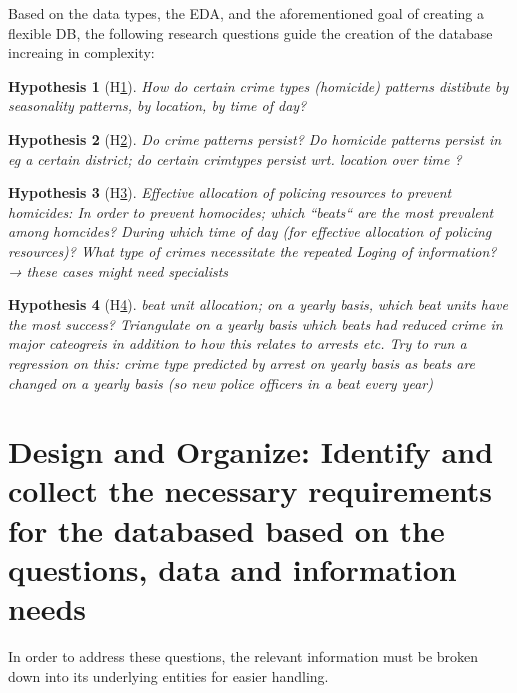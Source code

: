 \documentclass[a4paper]{article}
\newtheorem{hyp}{Hypothesis}
\begin{document}
Based on the data types, the EDA, and the aforementioned goal of creating a flexible DB, the following research questions guide the creation of the database increaing in complexity:


\begin{hyp}[H\ref{hyp:first}] \label{hyp:first}
How do certain crime types (homicide) patterns distibute by seasonality patterns, by location, by time of day?
\end{hyp}

\begin{hyp}[H\ref{hyp:second}] \label{hyp:second}
Do crime patterns persist? Do homicide patterns persist in eg a certain district; do certain crimtypes persist wrt. location over time ?
\end{hyp}

\begin{hyp}[H\ref{hyp:third}] \label{hyp:third}
Effective allocation of policing resources to prevent homicides:
In order to prevent homocides; which “beats“ are the most prevalent among homcides? During which time of day (for effective allocation of policing resources)? 
 What type of crimes necessitate the repeated Loging of information? → these cases might need specialists
\end{hyp}

\begin{hyp}[H\ref{hyp:fourth}] \label{hyp:fourth}
beat unit allocation; on a yearly basis, which beat units have the most success? Triangulate on a yearly basis which beats had reduced crime in major cateogreis in addition to how this relates to arrests etc. Try to run a regression on this: crime type predicted by arrest on yearly basis as beats are changed on a yearly basis (so new police officers in a beat every year)
\end{hyp}


\section{Design and Organize: Identify and collect the necessary requirements for the databased based on the questions, data and information needs}
In order to address these questions, the relevant information must be broken down into its underlying entities for easier handling. 
\end{document}
